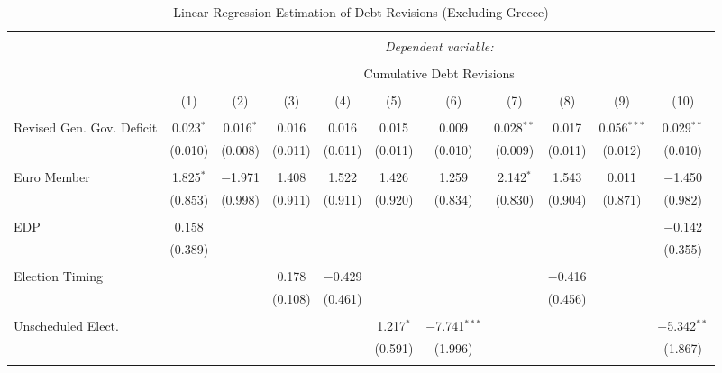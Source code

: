 
\begin{table}[!htbp] \centering 
  \caption{Linear Regression Estimation of Debt Revisions (Excluding Greece)} 
  \label{results_no_greece} 
\tiny 
\begin{tabular}{@{\extracolsep{5pt}}lcccccccccc} 
\\[-1.8ex]\hline 
\hline \\[-1.8ex] 
 & \multicolumn{10}{c}{\textit{Dependent variable:}} \\ 
\cline{2-11} 
\\[-1.8ex] & \multicolumn{10}{c}{Cumulative Debt Revisions} \\ 
\\[-1.8ex] & (1) & (2) & (3) & (4) & (5) & (6) & (7) & (8) & (9) & (10)\\ 
\hline \\[-1.8ex] 
 Revised Gen. Gov. Deficit & 0.023$^{*}$ & 0.016$^{*}$ & 0.016 & 0.016 & 0.015 & 0.009 & 0.028$^{**}$ & 0.017 & 0.056$^{***}$ & 0.029$^{**}$ \\ 
  & (0.010) & (0.008) & (0.011) & (0.011) & (0.011) & (0.010) & (0.009) & (0.011) & (0.012) & (0.010) \\ 
  & & & & & & & & & & \\ 
 Euro Member & 1.825$^{*}$ & $-$1.971 & 1.408 & 1.522 & 1.426 & 1.259 & 2.142$^{*}$ & 1.543 & 0.011 & $-$1.450 \\ 
  & (0.853) & (0.998) & (0.911) & (0.911) & (0.920) & (0.834) & (0.830) & (0.904) & (0.871) & (0.982) \\ 
  & & & & & & & & & & \\ 
 EDP & 0.158 &  &  &  &  &  &  &  &  & $-$0.142 \\ 
  & (0.389) &  &  &  &  &  &  &  &  & (0.355) \\ 
  & & & & & & & & & & \\ 
 Election Timing &  &  & 0.178 & $-$0.429 &  &  &  & $-$0.416 &  &  \\ 
  &  &  & (0.108) & (0.461) &  &  &  & (0.456) &  &  \\ 
  & & & & & & & & & & \\ 
 Unscheduled Elect. &  &  &  &  & 1.217$^{*}$ & $-$7.741$^{***}$ &  &  &  & $-$5.342$^{**}$ \\ 
  &  &  &  &  & (0.591) & (1.996) &  &  &  & (1.867) \\ 
  & & & & & & & & & & \\ 

\end{tabular}
\end{table}
